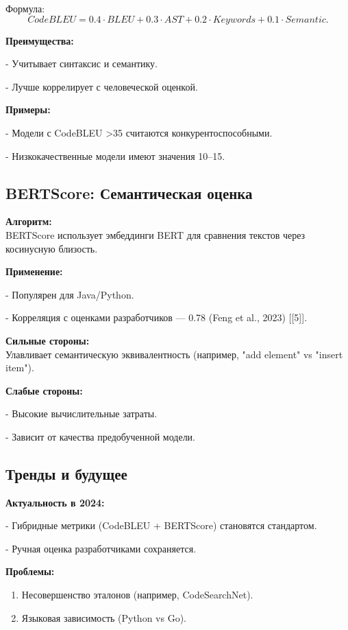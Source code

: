 \documentclass[14pt]{article}
\theoremstyle{definition}
\begin{document}
Формула:
\[
CodeBLEU = 0.4 \cdot BLEU + 0.3 \cdot AST + 0.2 \cdot Keywords + 0.1 \cdot Semantic.
\]

\textbf{Преимущества:}

    
- Учитывает синтаксис и семантику.
    
- Лучше коррелирует с человеческой оценкой.


\textbf{Примеры:}

    
- Модели с CodeBLEU >35 считаются конкурентоспособными.
    
- Низкокачественные модели имеют значения 10–15.


\subsection{BERTScore: Семантическая оценка}

\textbf{Алгоритм:} \\
BERTScore использует эмбеддинги BERT для сравнения текстов через косинусную близость.

\textbf{Применение:}

    
- Популярен для Java/Python.
    
- Корреляция с оценками разработчиков — 0.78 (Feng et al., 2023) [[5]].


\textbf{Сильные стороны:} \\
Улавливает семантическую эквивалентность (например, "add element" vs "insert item").

\textbf{Слабые стороны:}

    
- Высокие вычислительные затраты.
    
- Зависит от качества предобученной модели.


\subsection{Тренды и будущее}

\textbf{Актуальность в 2024:}

    
- Гибридные метрики (CodeBLEU + BERTScore) становятся стандартом.
    
- Ручная оценка разработчиками сохраняется.


\textbf{Проблемы:}
\begin{enumerate}
    \item Несовершенство эталонов (например, CodeSearchNet).
    \item Языковая зависимость (Python vs Go).
\end{enumerate}
\end{document}
